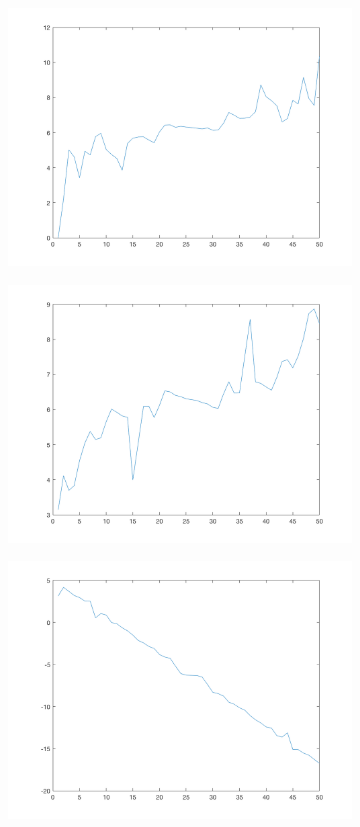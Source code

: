 \begin{figure}[htpb]
\begin{subfigure}{.25\textwidth}
\includegraphics[width=1\textwidth]{img/ProjXPCsigma150}
\end{subfigure}%
\begin{subfigure}{.25\textwidth}
\includegraphics[width=1\textwidth]{img/ProjXPCsigma300}
\end{subfigure}
\quad
\begin{subfigure}{.25\textwidth}
\includegraphics[width=1\textwidth]{img/ProjYPCsigma0}

\end{subfigure}
\end{figure}
